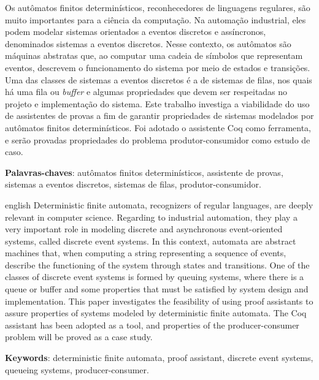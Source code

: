 \begin{resumo}
 Os autômatos finitos determinísticos, reconhecedores de linguagens regulares, são muito importantes para a ciência da computação. Na automação industrial, eles podem modelar sistemas orientados a eventos discretos e assíncronos, denominados sistemas a eventos discretos. Nesse contexto, os autômatos são máquinas abstratas que, ao computar uma cadeia de símbolos que representam eventos, descrevem o funcionamento do sistema por meio de estados e transições. Uma das classes de sistemas a eventos discretos é a de sistemas de filas, nos quais há uma fila ou \textit{buffer} e algumas propriedades que devem ser respeitadas no projeto e implementação do sistema. Este trabalho investiga a viabilidade do uso de assistentes de provas a fim de garantir propriedades de sistemas modelados por autômatos finitos determinísticos. Foi adotado o assistente Coq como ferramenta, e serão provadas propriedades do problema produtor-consumidor como estudo de caso.

 \vspace{\onelineskip}
    
 \noindent
 \textbf{Palavras-chaves}: autômatos finitos determinísticos, assistente de provas, sistemas a eventos discretos, sistemas de filas, produtor-consumidor.
\end{resumo}


\begin{resumo}[Abstract]
 \begin{otherlanguage*}{english}
 Deterministic finite automata, recognizers of regular languages, are deeply relevant in computer science. Regarding to industrial automation, they play a very important role in modeling discrete and asynchronous event-oriented systems, called discrete event systems. In this context, automata are abstract machines that, when computing a string representing a sequence of events, describe the functioning of the system through states and transitions. One of the classes of discrete event systems is formed by queuing systems, where there is a queue or buffer and some properties that must be satisfied by system design and implementation. This paper investigates the feasibility of using proof assistants to assure properties of systems modeled by deterministic finite automata. The Coq assistant has been adopted as a tool, and properties of the producer-consumer problem will be proved as a case study.
 
 \vspace{\onelineskip}
 
 \noindent 
 \textbf{Keywords}: deterministic finite automata, proof assistant, discrete event systems, queueing systems, producer-consumer.
 \end{otherlanguage*}
\end{resumo}


\listoffigures*
\cleardoublepage




\listofquadros*
\cleardoublepage
